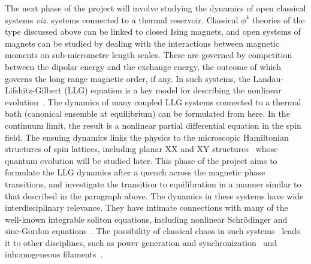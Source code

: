 \documentclass[a4paper,10pt]{report}
\begin{document}
The next phase of the project will involve studying the dynamics of open classical systems \textit{viz.} systems connected to a thermal reservoir. Classical $\phi^4$ theories of the type discussed above can be linked to closed Ising magnets, and open systems of magnets can be studied by dealing with the interactions between magnetic moments on sub-micrometre length scales. These are governed by competition between the dipolar energy and the exchange energy, the outcome of which governs the long range magnetic order, if any. In such systems, the Landau-Lifshitz-Gilbert (LLG) equation is a key model for describing the nonlinear evolution~\cite{gll:review}. The dynamics of many coupled LLG systems connected to a thermal bath (canonical ensemble at equilibrium) can be 
formulated from here. In the continuum limit, the result is a nonlinear partial differential equation in the spin field. The ensuing dynamics links the physics to the microscopic Hamiltonian structures of spin lattices, including planar XX and XY structures~\cite{gll:review} whose quantum evolution will be studied later. This phase of the project aims to formulate the LLG dynamics after a quench across the magnetic phase transitions, and investigate the transition to equilibration in a manner similar to that described in the paragraph above. The dynamics in these systems have wide interdisciplinary relevance. They have intimate connections with many of the well-known integrable soliton equations, including nonlinear Schr\"odinger and sine-Gordon equations~\cite{gll:review,sinegordon}. The possibility of classical chaos in such systems~\cite{gll:review} leads it to other disciplines, such as power generation and synchronization~\cite{lax13} and inhomogeneous filaments~\cite{lax14}. 
\end{document}
